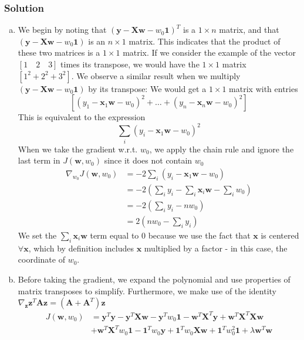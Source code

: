 \documentclass[submit]{harvardml}
\begin{document}
\subsubsection*{Solution}
\begin{enumerate}[(a)]
	\item We begin by noting that $(\textbf{y} - \textbf{X}\textbf{w}- w_0\textbf{1})^T$ is a $1 \times n$ matrix, and that $(\textbf{y} - \textbf{X}\textbf{w}- w_0\textbf{1})$ is an $n \times 1$ matrix. This indicates that the product of 
	these two matrices is a $1 \times 1$ matrix. If we consider the example of the vector $[1 \quad 2 \quad 3]$ times
	its transpose, we would have the $1 \times 1$ matrix $[1^2 +2^2+3^2]$. We observe a similar result when we multiply $(\textbf{y} - \textbf{X}\textbf{w}- w_0\textbf{1})$ by its transpose: We would get a $1 \times 1$ matrix
	with entries
		$$[(y_1-\textbf{x}_1\textbf{w} - w_0)^2 + \dots +  (y_n-\textbf{x}_n\textbf{w} - w_0)^2 ]$$
	This is equivalent to the expression
		$$\sum_{i} (y_i - \textbf{x}_1\textbf{w} - w_0)^2 $$	
	When we take the gradient w.r.t. $w_0$, we apply the chain rule and ignore the last term in $J(\textbf{w},w_0)$
	since it does not contain $w_0$
		\begin{align*}
			\nabla_{w_0} J(\textbf{w},w_0) &= -2 \sum_{i} (y_i - \textbf{x}_1\textbf{w} - w_0) \\
			&= -2 \left(\sum_i y_i - \sum_i \textbf{x}_i\textbf{w} - \sum_i w_0\right) \\
			&= -2 \left(\sum_i y_i - nw_0\right) \\
			&= \boxed{2\left(nw_0-\sum_i y_i  \right)}
		\end{align*}	
	We set the $\sum_i \textbf{x}_i\textbf{w}$ term equal to 0 because we use the fact that $\textbf{x}$ is centered $\forall \textbf{x}$, 
	which by definition includes $\textbf{x}$ multiplied by a factor - in this case, the coordinate of $w_0$. 
	\item  Before taking the gradient, we expand the polynomial and use properties of matrix transposes to 
	simplify. Furthermore, we make use
	of the identity $\nabla_\textbf{z} \textbf{z}^T \textbf{A} \textbf{z} =  (\textbf{A}+ \textbf{A}^T)\textbf{z}$
		\begin{align*}
			J(\textbf{w},w_0) &= \textbf{y}^T\textbf{y} - \textbf{y}^T\textbf{X}\textbf{w} - \textbf{y}^Tw_0\textbf{1} - \textbf{w}^T\textbf{X}^T\textbf{y} +\textbf{w}^T\textbf{X}^T\textbf{X}\textbf{w} \\
			&+ \textbf{w}^T\textbf{X}^Tw_0\textbf{1} -  \textbf{1}^Tw_0\textbf{y} + \textbf{1}^Tw_0\textbf{X}\textbf{w} + \textbf{1}^Tw_0^2\textbf{1} + \lambda\textbf{w}^T\textbf{w} \\

\end{align*}
\end{enumerate}
\end{document}
